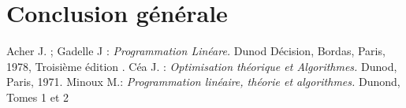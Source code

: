 \documentclass[a4paper,11pt,oneside]{report}
\theoremstyle{plain}
\newcommand{\0}{/ \! \! \! 0}
\theoremstyle{plain}
\begin{document}
\chapter*{Conclusion g\'en\'erale}





\begin{thebibliography}{10}

Acher J. ; Gadelle J : 
\emph{Programmation Lin\'eare.} 
Dunod D\'ecision, Bordas, Paris, 1978, Troisi\`eme \'edition .
C\'ea J. : 
\emph{Optimisation th\'eorique et Algorithmes.}
Dunod, Paris, 1971.
Minoux M.:
\emph{Programmation lin\'eaire, th\'eorie et algorithmes.}
Dunond, Tomes 1 et 2


\end{thebibliography}
\end{document}
